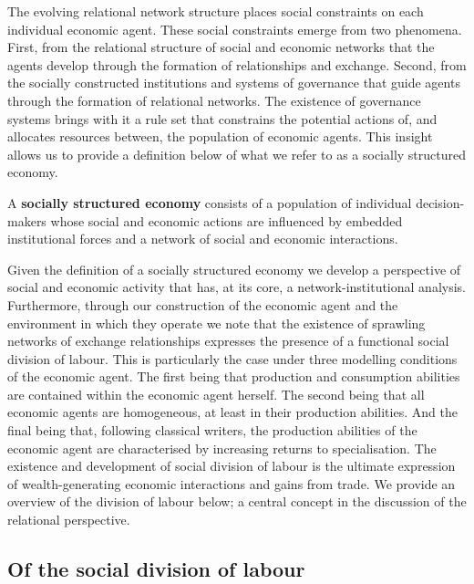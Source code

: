 The evolving relational network structure places social constraints on each individual economic agent. These social constraints emerge from two phenomena. First, from the relational structure of social and economic networks that the agents develop through the formation of relationships and exchange. Second, from the socially constructed institutions and systems of governance that guide agents through the formation of relational networks. The existence of governance systems brings with it a rule set that constrains the potential actions of, and allocates resources between, the population of economic agents. This insight allows us to provide a definition below of what we refer to as a socially structured economy.

\begin{definition}
A \textbf{socially structured economy} consists of a population of individual decision-makers whose social and economic actions are influenced by embedded institutional forces and a network of social and economic interactions.
\end{definition}

Given the definition of a socially structured economy we develop a perspective of social and economic activity that has, at its core, a network-institutional analysis. Furthermore, through our construction of the economic agent and the environment in which they operate we note that the existence of sprawling networks of exchange relationships expresses the presence of a functional social division of labour. This is particularly the case under three modelling conditions of the economic agent. The first being that production and consumption abilities are contained within the economic agent herself. The second being that all economic agents are homogeneous, at least in their production abilities. And the final being that, following classical writers, the production abilities of the economic agent are characterised by increasing returns to specialisation. The existence and development of social division of labour is the ultimate expression of wealth-generating economic interactions and gains from trade. We provide an overview of the division of labour below; a central concept in the discussion of the relational perspective.

\subsection{Of the social division of labour}

